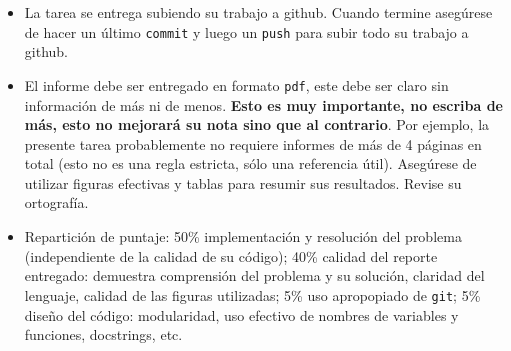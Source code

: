 \documentclass[letter, 11pt]{article}
\begin{document}
\begin{itemize}
  \item La tarea se entrega subiendo su trabajo a github. Cuando termine
    asegúrese de hacer un último \texttt{commit} y luego un \texttt{push} para
    subir todo su trabajo a github.

  \item El informe debe ser entregado en formato \texttt{pdf}, este debe ser
    claro sin información de más ni de menos. \textbf{Esto es muy importante,
    no escriba de más, esto no mejorará su nota sino que al contrario}. Por
    ejemplo, la presente tarea probablemente no requiere informes de más de 4
    páginas en total (esto no es una regla estricta, sólo una referencia útil).
    Asegúrese de utilizar figuras efectivas y tablas para resumir sus
    resultados. Revise su ortografía.

  \item Repartición de puntaje: 50\% implementación y resolución del problema
    (independiente de la calidad de su código); 40\% calidad del reporte
    entregado: demuestra comprensión del problema y su solución, claridad del
    lenguaje, calidad de las figuras utilizadas; 5\% uso apropopiado de
    \texttt{git}; 5\% diseño del código: modularidad, uso efectivo de nombres
    de variables y funciones, docstrings, etc.

\end{itemize}

\end{document}
